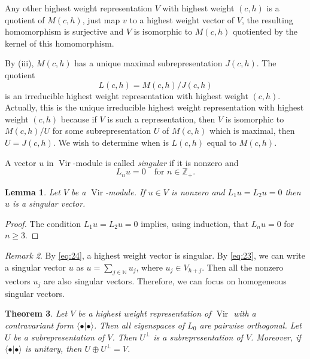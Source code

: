 \documentclass[a4paper, 12pt, reqno]{amsart}
\newtheorem{theorem}{Theorem}[section]
\newtheorem{lemma}[theorem]{Lemma}
\theoremstyle{remark}
\newtheorem{remark}[theorem]{Remark}
\numberwithin{equation}{subsection}
\DeclareMathOperator{\Vir}{Vir}
\begin{document}
Any other highest weight representation $V$ with highest weight $(c, h)$ is a quotient of $M(c, h)$, just map $v$ to a highest weight vector of $V$, the resulting homomorphism is surjective and $V$ is isomorphic to $M(c, h)$ quotiented by the kernel of this homomorphism.

By (iii), $M(c, h)$ has a unique maximal subrepresentation $J(c, h)$.
The quotient
\begin{equation*}
  L(c, h) = M(c, h)/J(c, h)
\end{equation*}
is an irreducible highest weight representation with highest weight $(c, h)$.
Actually, this is the unique irreducible highest weight representation with highest weight $(c, h)$ because if $V$ is such a representation, then $V$ is isomorphic to $M(c, h)/U$ for some subrepresentation $U$ of $M(c, h)$ which is maximal, then $U = J(c, h)$.
We wish to determine when is $L(c, h)$ equal to $M(c, h)$.

A vector $u$ in $\Vir$-module is called \emph{singular} if it is nonzero and
\begin{equation*}
  L_nu = 0 \quad \text{for }n \in \mathbb{Z}_+.
\end{equation*}

\begin{lemma}
  \label{lmm:17}
  Let $V$ be a $\Vir$-module.
  If $u \in V$ is nonzero and $L_1u = L_2u = 0$ then $u$ is a singular vector.
\end{lemma}

\begin{proof}
  The condition $L_1u = L_2u = 0$ implies, using induction, that $L_nu = 0$ for $n \ge 3$.
\end{proof}

\begin{remark}
  \label{rmk:26}
  By \eqref{eq:24}, a highest weight vector is singular.
  By \eqref{eq:23}, we can  write a singular vector $u$ as $u = \sum_{j \in \mathbb{N}}u_j$, where $u_j \in V_{h + j}$.
  Then all the nonzero vectors $u_j$ are also singular vectors.
  Therefore, we can focus on homogeneous singular vectors.
\end{remark}

\begin{theorem}
  \label{thr:28}
  Let $V$ be a highest weight representation of $\Vir$ with a contravariant form $\langle \bullet| \bullet\rangle$.
  Then all eigenspaces of $L_0$ are pairwise orthogonal.
  Let $U$ be a subrepresentation of $V$.
  Then $U^{\perp}$ is a subrepresentation of $V$.
  Moreover, if $\langle \bullet| \bullet\rangle$ is unitary, then $U \oplus U^{\perp} = V$.
\end{theorem}
\end{document}
